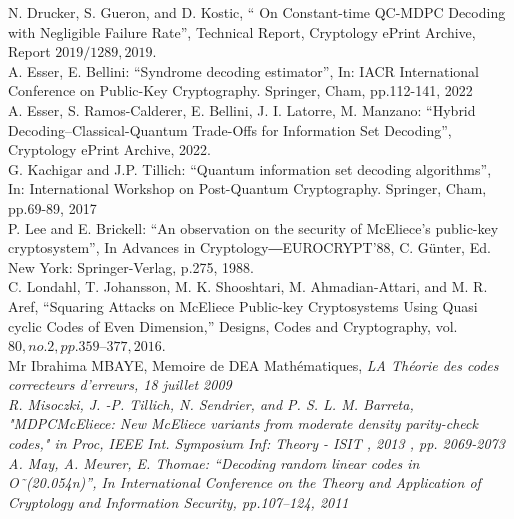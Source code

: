 \documentclass[12pt,openany]{report}
\begin{document}
\begin{thebibliography}{1}
 N. Drucker, S. Gueron, and D. Kostic, “ On Constant-time QC-MDPC Decoding with Negligible Failure Rate”, Technical Report, Cryptology ePrint Archive, Report $2019/1289, 2019.$\\

 A. Esser, E. Bellini: “Syndrome decoding estimator”, In: IACR International Conference on Public-Key Cryptography. Springer, Cham, pp.112-141, 2022 \\

  A. Esser, S. Ramos-Calderer, E. Bellini, J. I. Latorre, M. Manzano: “Hybrid
Decoding–Classical-Quantum Trade-Offs for Information Set Decoding”, Cryptology ePrint Archive, 2022.\\


 G. Kachigar and J.P. Tillich: “Quantum information set decoding algorithms”, In:
International Workshop on Post-Quantum Cryptography. Springer, Cham, pp.69-89, 2017\\



 P. Lee and E. Brickell: “An observation on the security of McEliece’s public-key
cryptosystem”, In Advances in Cryptology―EUROCRYPT’88, C. Günter, Ed. New
York: Springer-Verlag, p.275, 1988.\\


 C. Londahl, T. Johansson, M. K. Shooshtari, M. Ahmadian-Attari, and M. R. Aref, “Squaring Attacks on McEliece Public-key Cryptosystems Using Quasi cyclic Codes of Even Dimension,” Designs, Codes and Cryptography, vol.$ 80, no. 2, pp. 359–377, 2016.$\\

 Mr Ibrahima MBAYE, Memoire de DEA Mathématiques, \it{LA Théorie des codes correcteurs d'erreurs}, 18 juillet 2009
 \\

 
  R. Misoczki, J. -P. Tillich, N. Sendrier, and P. S. L. M. Barreta, "MDPCMcEliece: New McEliece variants from moderate density parity-check codes," \it{ in Proc, IEEE Int. Symposium Inf: Theory - ISIT , 2013 } , pp. 2069-2073\\
 

 A. May, A. Meurer, E. Thomae: “Decoding random linear codes in O˜(20.054n)”, In International Conference on the Theory and Application of Cryptology and Information Security, pp.107–124, 2011\\


\end{thebibliography}
\end{document}
